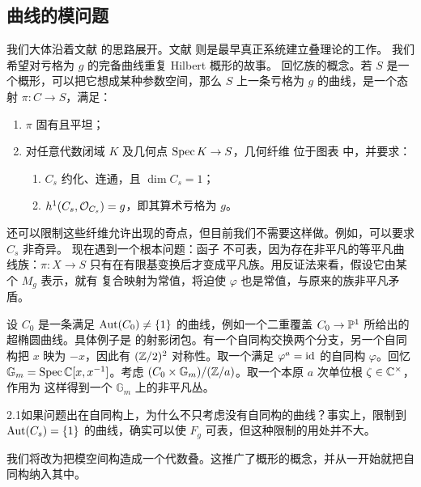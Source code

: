 \subsection{曲线的模问题}
我们大体沿着文献 \cite{ref9} 的思路展开。文献 \cite{ref8} 则是最早真正系统建立叠理论的工作。
我们希望对亏格为 $g$ 的完备曲线重复 Hilbert 概形的故事。
回忆族的概念。若 $S$ 是一个概形，可以把它想成某种参数空间，那么 $S$ 上一条亏格为 $g$ 的曲线，是一个态射 $\pi:C\to S$，满足：
\begin{enumerate}
\item $\pi$ 固有且平坦；
\item 对任意代数闭域 $K$ 及几何点 $\operatorname{Spec} K\to S$，几何纤维
位于图表
中，并要求：
\begin{enumerate}
\item $C_s$ 约化、连通，且 $\dim C_s=1$；
\item $h^1(C_s,\mathcal O_{C_s})=g$，即其算术亏格为 $g$。
\end{enumerate}
\end{enumerate}
还可以限制这些纤维允许出现的奇点，但目前我们不需要这样做。例如，可以要求 $C_s$ 非奇异。
现在遇到一个根本问题：函子
不可表，因为存在非平凡的等平凡曲线族：$\pi:X\to S$ 只有在有限基变换后才变成平凡族。用反证法来看，假设它由某个 $M_g$ 表示，就有
复合映射为常值，将迫使 $\varphi$ 也是常值，与原来的族非平凡矛盾。
\begin{example}\label{ex:2.3}
设 $C_0$ 是一条满足 $\operatorname{Aut}(C_0)\ne\{1\}$ 的曲线，例如一个二重覆盖 $C_0\to\mathbb P^1$ 所给出的超椭圆曲线。具体例子是
的射影闭包。有一个自同构交换两个分支，另一个自同构把 $x$ 映为 $-x$，因此有 $(\mathbb Z/2)^2$ 对称性。取一个满足 $\varphi^a=\operatorname{id}$ 的自同构 $\varphi$。回忆 $\mathbb G_m=\operatorname{Spec}\mathbb C[x,x^{-1}]$。考虑 $(C_0\times\mathbb G_m)/(\mathbb Z/a)$。取一个本原 $a$ 次单位根 $\zeta\in\mathbb C^\times$，作用为
这样得到一个 $\mathbb G_m$ 上的非平凡丛。
\end{example}
\begin{Note}{2.1}如果问题出在自同构上，为什么不只考虑没有自同构的曲线？事实上，限制到 $\operatorname{Aut}(C_s)=\{1\}$ 的曲线，确实可以使 $F_g$ 可表，但这种限制的用处并不大。\end{Note}
我们将改为把模空间构造成一个代数叠。这推广了概形的概念，并从一开始就把自同构纳入其中。

